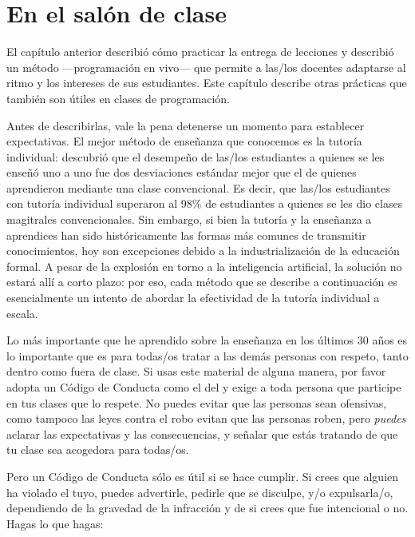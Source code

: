 \chapter{En el salón de clase}\label{s:classroom}

El capítulo anterior describió cómo practicar la entrega de lecciones
y describió un método ---programación en vivo--- que
permite a las/los docentes adaptarse al ritmo y los intereses de sus estudiantes.
Este capítulo describe otras prácticas que también son útiles en clases de programación.

Antes de describirlas,
vale la pena detenerse un momento para establecer expectativas.
El mejor método de enseñanza que conocemos es la tutoría individual: 
\cite{Bloo1984} descubrió que el desempeño de las/los estudiantes a quienes se les enseñó uno a uno
fue dos desviaciones estándar mejor que el de quienes aprendieron mediante una clase convencional.
Es decir, que las/los estudiantes con tutoría individual superaron al
98\% de estudiantes a quienes se les dio clases magitrales convencionales.
Sin embargo,
si bien la tutoría y la enseñanza a aprendices han sido históricamente las formas más comunes de transmitir conocimientos,
hoy son excepciones debido a la
industrialización de la educación formal.
A pesar de la explosión en torno a la inteligencia artificial,
la solución no estará allí a corto plazo:
por eso, cada método que se describe a continuación es esencialmente
un intento de abordar la efectividad de la tutoría individual a escala.


Lo más importante que he aprendido sobre la enseñanza en los últimos 30 años es
lo importante que es para todas/os tratar a las demás personas con respeto,
tanto dentro como fuera de clase.
Si usas este material de alguna manera,
por favor adopta un Código de Conducta como el del 
y exige a toda persona que participe en tus clases que lo respete.
No puedes evitar que las personas sean ofensivas,
como tampoco las leyes contra el robo evitan que las personas roben,
pero \emph{puedes} aclarar las expectativas y las consecuencias,
y señalar que estás tratando de que tu clase sea acogedora para todas/os.

Pero un Código de Conducta sólo es útil si se hace cumplir.
Si crees que alguien ha violado el tuyo,
puedes advertirle,
pedirle que se disculpe,
y/o expulsarla/o,
dependiendo de la gravedad de la infracción y de si crees que fue intencional o no.
Hagas lo que hagas:

